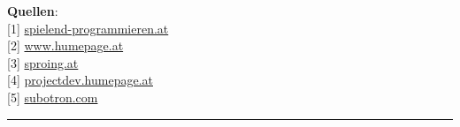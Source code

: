 \documentclass[10pt,a4paper,ngerman,twoside]{article} %
\newcommand{\SepRule}{\noindent	%
\begin{center}
\rule{250pt}{1pt} %
\end{center}
}
\begin{document}
\textbf{Quellen}: \\
{[}1{]} \href{http://spielend-programmieren.at}{spielend-programmieren.at} \\
{[}2{]} \href{http://www.humepage.at}{www.humepage.at} \\
{[}3{]} \href{https://www.sproing.at/}{sproing.at} \\
{[}4{]} \href{http://projectdev.humepage.at/}{projectdev.humepage.at} \\
{[}5{]} \href{http://subotron.com/}{subotron.com} \\








\SepRule
\end{document}
